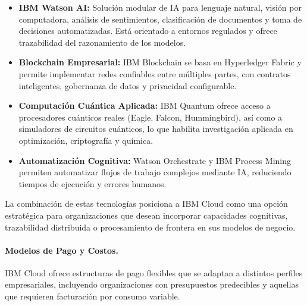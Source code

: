 {                \begin{itemize}
                    \item \textbf{IBM Watson AI:} Solución modular de IA para lenguaje natural, visión por computadora, análisis de sentimientos, clasificación de documentos y toma de decisiones automatizadas. Está orientado a entornos regulados y ofrece trazabilidad del razonamiento de los modelos.
                    \item \textbf{Blockchain Empresarial:} IBM Blockchain se basa en Hyperledger Fabric y permite implementar redes confiables entre múltiples partes, con contratos inteligentes, gobernanza de datos y privacidad configurable.
                    \item \textbf{Computación Cuántica Aplicada:} IBM Quantum ofrece acceso a procesadores cuánticos reales (Eagle, Falcon, Hummingbird), así como a simuladores de circuitos cuánticos, lo que habilita investigación aplicada en optimización, criptografía y química.
                    \item \textbf{Automatización Cognitiva:} Watson Orchestrate y IBM Process Mining permiten automatizar flujos de trabajo complejos mediante IA, reduciendo tiempos de ejecución y errores humanos.
                \end{itemize}
                
                La combinación de estas tecnologías posiciona a IBM Cloud como una opción estratégica para organizaciones que desean incorporar capacidades cognitivas, trazabilidad distribuida o procesamiento de frontera en sus modelos de negocio.
                
                \paragraph{Modelos de Pago y Costos.}
                IBM Cloud ofrece estructuras de pago flexibles que se adaptan a distintos perfiles empresariales, incluyendo organizaciones con presupuestos predecibles y aquellas que requieren facturación por consumo variable.
                
}
